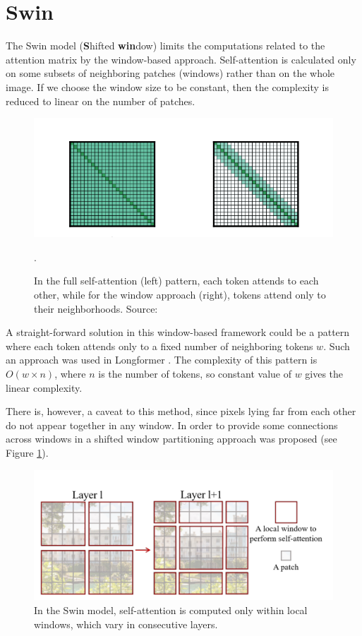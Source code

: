 \documentclass[en]{pracamgr}
\begin{document}
\section{Swin}\label{r:swin}
The Swin model (\textbf{S}hifted \textbf{win}dow) \cite{DBLP:conf/iccv/LiuL00W0LG21} limits the computations related to the attention matrix by the window-based approach. Self-attention is calculated only on some subsets of neighboring patches (windows) rather than on the whole image. If we choose the window size to be constant, then the complexity is reduced to linear on the number of patches.

\begin{figure}[H]
\centering
\includegraphics[scale=0.4]{./images/sliding_window.png}
\caption{In the full self-attention (left) pattern, each token attends to each other, while for the window approach (right), tokens attend only to their neighborhoods. Source: \cite{DBLP:journals/corr/abs-2004-05150}}.
\end{figure}


A straight-forward solution in this window-based framework could be a pattern where each token attends only to a fixed number of neighboring tokens $w$. Such an approach was used in Longformer \cite{DBLP:journals/corr/abs-2004-05150}. The complexity of this pattern is $O(w \times n)$, where $n$ is the number of tokens, so constant
value of $w$ gives the linear complexity.

There is, however, a caveat to this method, since pixels lying far from each other do not appear together in any window. In order to provide some connections across windows in \cite{DBLP:conf/iccv/LiuL00W0LG21} a shifted window partitioning approach was proposed (see Figure \ref{changing_windows}).


\begin{figure}[H]
\centering
\includegraphics[scale=0.6]{./images/changing_windows.png}
\caption{In the Swin model, self-attention is computed only within local windows, which vary in consecutive layers.}
\label{changing_windows}
\end{figure}
\end{document}
